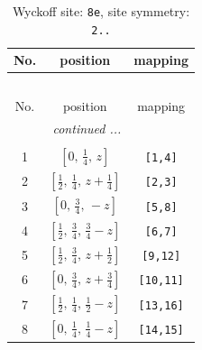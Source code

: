 \documentclass[fleqn,8pt]{jsarticle}
\begin{document}
\begin{longtable}{ccc}
\caption{Wyckoff site: {\tt 8e}, site symmetry: {\tt 2..}}
 \\
 \hline \hline
No. & position & mapping \\ \hline \endfirsthead

\multicolumn{2}{l}{\tablename\ \thetable{}} \\
 \hline \hline
No. & position & mapping \\ \hline \endhead

 \hline \hline
\multicolumn{2}{r}{\footnotesize\it continued ...} \\ \endfoot

 \hline \hline
\multicolumn{2}{r}{} \\ \endlastfoot

1 & $\left[ 0,\, \frac{1}{4},\, z \right]$ & {\tt [1,4]} \\ \hline
2 & $\left[ \frac{1}{2},\, \frac{1}{4},\, z + \frac{1}{4} \right]$ & {\tt [2,3]} \\ \hline
3 & $\left[ 0,\, \frac{3}{4},\, - z \right]$ & {\tt [5,8]} \\ \hline
4 & $\left[ \frac{1}{2},\, \frac{3}{4},\, \frac{3}{4} - z \right]$ & {\tt [6,7]} \\ \hline
5 & $\left[ \frac{1}{2},\, \frac{3}{4},\, z + \frac{1}{2} \right]$ & {\tt [9,12]} \\ \hline
6 & $\left[ 0,\, \frac{3}{4},\, z + \frac{3}{4} \right]$ & {\tt [10,11]} \\ \hline
7 & $\left[ \frac{1}{2},\, \frac{1}{4},\, \frac{1}{2} - z \right]$ & {\tt [13,16]} \\ \hline
8 & $\left[ 0,\, \frac{1}{4},\, \frac{1}{4} - z \right]$ & {\tt [14,15]} \\
\end{longtable}
\renewcommand{\arraystretch}{1.2}
\end{document}
